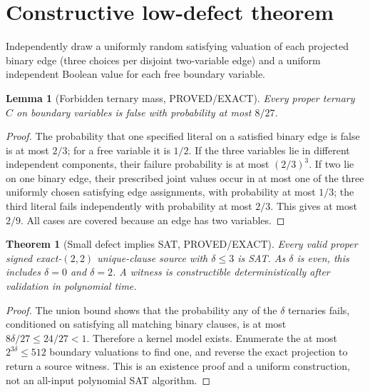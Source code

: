 \documentclass[11pt]{article}
\newtheorem{theorem}{Theorem}
\newtheorem{lemma}{Lemma}
\begin{document}
\section{Constructive low-defect theorem}
Independently draw a uniformly random satisfying valuation of each projected binary edge (three choices per disjoint two-variable edge) and a uniform independent Boolean value for each free boundary variable.
\begin{lemma}[Forbidden ternary mass, PROVED/EXACT]
Every proper ternary $C$ on boundary variables is false with probability at most $8/27$.
\end{lemma}
\begin{proof}
The probability that one specified literal on a satisfied binary edge is false is at most $2/3$; for a free variable it is $1/2$. If the three variables lie in different independent components, their failure probability is at most $(2/3)^3$. If two lie on one binary edge, their prescribed joint values occur in at most one of the three uniformly chosen satisfying edge assignments, with probability at most $1/3$; the third literal fails independently with probability at most $2/3$. This gives at most $2/9$. All cases are covered because an edge has two variables.
\end{proof}
\begin{theorem}[Small defect implies SAT, PROVED/EXACT]
Every valid proper signed exact-$(2,2)$ unique-clause source with $\delta\le3$ is SAT. As $\delta$ is even, this includes $\delta=0$ and $\delta=2$. A witness is constructible deterministically after validation in polynomial time.
\end{theorem}
\begin{proof}
The union bound shows that the probability any of the $\delta$ ternaries fails, conditioned on satisfying all matching binary clauses, is at most $8\delta/27\le24/27<1$. Therefore a kernel model exists. Enumerate the at most $2^{3\delta}\le512$ boundary valuations to find one, and reverse the exact projection to return a source witness. This is an existence proof and a uniform construction, not an all-input polynomial SAT algorithm.
\end{proof}
\end{document}
